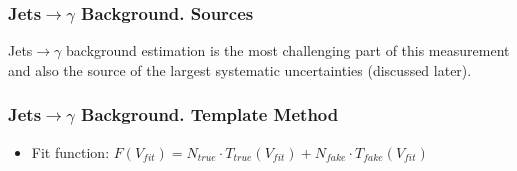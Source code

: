 \begin{frame}\frametitle{Jets$\rightarrow \gamma$ Background. Sources}
  \scriptsize
  Jets$\rightarrow \gamma$ background estimation is the most challenging part of this measurement and also the source of the largest systematic uncertainties (discussed later).
\end{frame}

\begin{frame}\frametitle{Jets$\rightarrow \gamma$ Background. Template Method}
  \scriptsize
  \begin{itemize}
    \item Fit function: $F(V_{fit})=N_{true} \cdot T_{true}(V_{fit}) + N_{fake} \cdot T_{fake}(V_{fit})$
  \end{itemize}
\end{frame}

